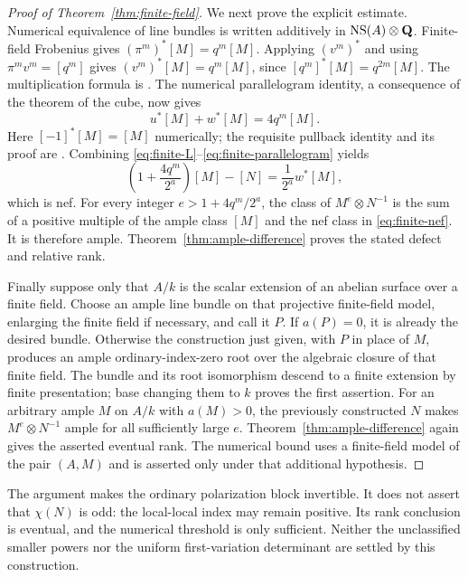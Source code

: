 \begin{proof}[Proof of Theorem~\ref{thm:finite-field}]
We next prove the explicit estimate. Numerical equivalence of line bundles is written additively in $\operatorname{NS}(A)\otimes\mathbf Q$. Finite-field Frobenius gives $(\pi^m)^*[M]=q^m[M]$. Applying $(v^m)^*$ and using $\pi^mv^m=[q^m]$ gives $(v^m)^*[M]=q^m[M]$, since $[q^m]^*[M]=q^{2m}[M]$. The multiplication formula is \citet[Corollary~2.12 and proof, p.~21]{EGM}. The numerical parallelogram identity, a consequence of the theorem of the cube, now gives
\begin{equation}\label{eq:finite-parallelogram}
                  u^*[M]+w^*[M]=4q^m[M].
\end{equation}
Here $[-1]^*[M]=[M]$ numerically; the requisite pullback identity and its proof are \citet[Theorem~2.7 and Corollary~2.8, pp.~19--20]{EGM}. Combining \eqref{eq:finite-L}--\eqref{eq:finite-parallelogram} yields
\begin{equation}\label{eq:finite-nef}
 \left(1+\frac{4q^m}{2^a}\right)[M]-[N]
                  =\frac{1}{2^a}w^*[M],
\end{equation}
which is nef. For every integer $e>1+4q^m/2^a$, the class of $M^e\otimes N^{-1}$ is the sum of a positive multiple of the ample class $[M]$ and the nef class in \eqref{eq:finite-nef}. It is therefore ample. Theorem~\ref{thm:ample-difference} proves the stated defect and relative rank.

Finally suppose only that $A/k$ is the scalar extension of an abelian surface over a finite field. Choose an ample line bundle on that projective finite-field model, enlarging the finite field if necessary, and call it $P$. If $a(P)=0$, it is already the desired bundle. Otherwise the construction just given, with $P$ in place of $M$, produces an ample ordinary-index-zero root over the algebraic closure of that finite field. The bundle and its root isomorphism descend to a finite extension by finite presentation; base changing them to $k$ proves the first assertion. For an arbitrary ample $M$ on $A/k$ with $a(M)>0$, the previously constructed $N$ makes $M^e\otimes N^{-1}$ ample for all sufficiently large $e$. Theorem~\ref{thm:ample-difference} again gives the asserted eventual rank. The numerical bound uses a finite-field model of the pair $(A,M)$ and is asserted only under that additional hypothesis.
\end{proof}

The argument makes the ordinary polarization block invertible. It does not assert that $\chi(N)$ is odd: the local-local index may remain positive. Its rank conclusion is eventual, and the numerical threshold is only sufficient. Neither the unclassified smaller powers nor the uniform first-variation determinant are settled by this construction.
